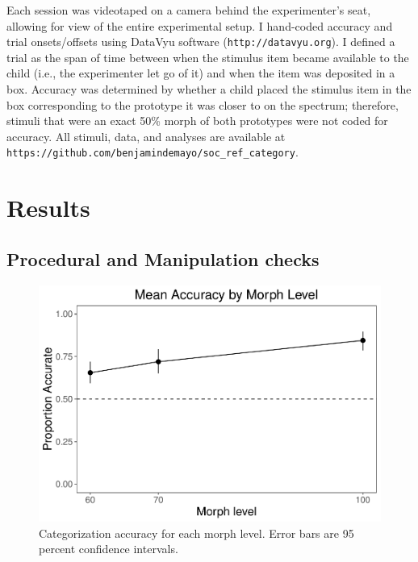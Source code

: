 \documentclass[,man,floatsintext]{apa6}
\begin{document}
Each session was videotaped on a camera behind the experimenter's seat, allowing for view of the entire experimental setup. I hand-coded accuracy and trial onsets/offsets using DataVyu software (\texttt{http://datavyu.org}). I defined a trial as the span of time between when the stimulus item became available to the child (i.e., the experimenter let go of it) and when the item was deposited in a box. Accuracy was determined by whether a child placed the stimulus item in the box corresponding to the prototype it was closer to on the spectrum; therefore, stimuli that were an exact 50\% morph of both prototypes were not coded for accuracy. All stimuli, data, and analyses are available at \texttt{https://github.com/benjamindemayo/soc\_ref\_category}.

\hypertarget{results}{%
\section{Results}\label{results}}

\hypertarget{procedural-and-manipulation-checks}{%
\subsection{Procedural and Manipulation checks}\label{procedural-and-manipulation-checks}}

\begin{figure}
\centering
\includegraphics{soc_ref_category_paper_files/figure-latex/morphaccuracy-1.pdf}
\caption{\label{fig:morphaccuracy}Categorization accuracy for each morph level. Error bars are 95 percent confidence intervals.}
\end{figure}
\end{document}
